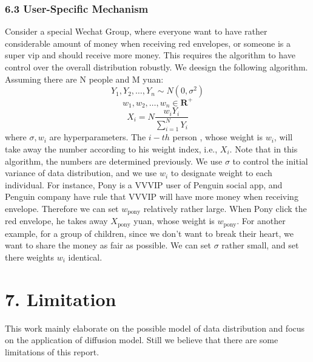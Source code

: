 \documentclass[11pt]{article}
\begin{document}
    \subsubsection*{6.3 User-Specific Mechanism}\label{user-specific-mechanism}

Consider a special Wechat Group, where everyone want to have rather
considerable amount of money when receiving red envelopes, or someone is
a super vip and should receive more money. This requires the algorithm
to have control over the overall distribution robustly. We deesign the
following algorithm. Assuming there are N people and M yuan: \[
Y_1, Y_2, \dots, Y_n \sim N(0, \sigma ^2)
\] \[
w_1, w_2, \dots, w_n \in \mathbf{R^+}
\] \[
X_i = N\frac{w_iY_i}{\sum_{i=1}^N Y_i}
\] where \(\sigma, w_i\) are hyperparameters. The \(i-th\) person ,
whose weight is \(w_i\), will take away the number according to his
weight index, i.e., \(X_i\). Note that in this algorithm, the numbers
are determined previously. We use \(\sigma\) to control the initial
variance of data distribution, and we use \(w_i\) to designate weight to
each individual. For instance, Pony is a VVVIP user of Penguin social
app, and Penguin company have rule that VVVIP will have more money when
receiving envelope. Therefore we can set \(w_{\text{pony}}\) relatively rather
large. When Pony click the red envelope, he takes away \(X_{\text{pony}}\)
yuan, whose weight is \(w_{\text{pony}}\). For another example, for a group of
children, since we don't want to break their heart, we want to share the
money as fair as possible. We can set \(\sigma\) rather small, and set
there weights \(w_i\) identical.

\section*{7. Limitation}

This work mainly elaborate on the possible model of data distribution and focus on the application of diffusion model. Still we believe that there are some limitations of this report. 
\end{document}
